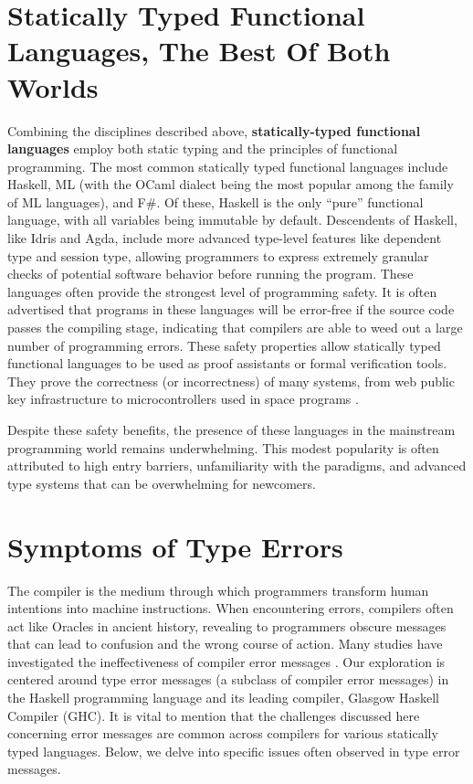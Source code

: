\section{Statically Typed Functional Languages, The Best Of Both Worlds}
Combining the disciplines described above, \textbf{statically-typed functional languages} employ both static typing and the principles of functional programming. The most common statically typed functional languages include Haskell,  ML (with the OCaml dialect being the most popular among the family of ML languages), and F\#. 
Of these, Haskell is the only ``pure'' functional language, with all variables being immutable by default.
Descendents of Haskell, like Idris and Agda, include more advanced type-level features like dependent type and session type, allowing programmers to express extremely granular checks of potential software behavior before running the program. These languages often provide the strongest level of programming safety. It is often advertised that programs in these languages will be error-free if the source code passes the compiling stage, indicating that compilers are able to weed out a large number of programming errors. These safety properties allow statically typed functional languages to be used as proof assistants or formal verification tools. They prove the correctness (or incorrectness) of many systems, from web public key infrastructure \cite{Bhargavan2021-no} to microcontrollers used in space programs \cite{Mokhov2019-zj}. 

Despite these safety benefits, the presence of these languages in the mainstream programming world remains underwhelming. This modest popularity is often attributed to high entry barriers, unfamiliarity with the paradigms, and advanced type systems that can be overwhelming for newcomers.

\section{Symptoms of Type Errors}
\label{sec:symptoms}
 The compiler is the medium through which programmers transform human intentions into machine instructions. When encountering errors, compilers often act like Oracles in ancient history, revealing to programmers obscure messages that can lead to confusion and the wrong course of action. Many studies have investigated the ineffectiveness of compiler error messages \cite{Barik2017-gy, Becker2019-cs, Becker2016-kc}.  Our exploration is centered around type error messages (a subclass of compiler error messages) in the Haskell programming language and its leading compiler, Glasgow Haskell Compiler (GHC). It is vital to mention that the challenges discussed here concerning error messages are common across compilers for various statically typed languages. Below, we delve into specific issues often observed in type error messages.


